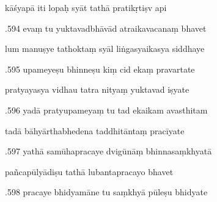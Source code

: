 \documentclass[article,12pt,a4paper]{memoir}%
\newcounter{parCount}
\begin{document}
	  
	  \pstart \leavevmode%
	kāśyapā iti lopaḥ syāt tathā pratikṛtiṣv api 
	{}
	\pend%
      

	  
	  \pstart {}.594 evaṃ tu yuktavadbhāvād atraikavacanaṃ bhavet 
	{}
	\pend%
      

	  
	  \pstart \leavevmode%
	lum manuṣye tathoktaṃ syāl liṅgasyaikasya siddhaye 
	{}
	\pend%
      

	  
	  \pstart {}.595 upameyeṣu bhinneṣu kiṃ cid ekaṃ pravartate 
	{}
	\pend%
      

	  
	  \pstart \leavevmode%
	pratyayasya vidhau tatra nityaṃ yuktavad iṣyate 
	{}
	\pend%
      

	  
	  \pstart {}.596 yadā pratyupameyaṃ tu tad ekaikam avasthitam 
	{}
	\pend%
      

	  
	  \pstart \leavevmode%
	tadā bāhyārthabhedena taddhitāntaṃ pracīyate 
	{}
	\pend%
      

	  
	  \pstart {}.597 yathā samūhapracaye dvigūnāṃ bhinnasaṃkhyatā 
	{}
	\pend%
      

	  
	  \pstart \leavevmode%
	pañcapūlyādiṣu tathā lubantapracayo bhavet 
	{}
	\pend%
      

	  
	  \pstart {}.598 pracaye bhidyamāne tu saṃkhyā pūleṣu bhidyate 
	{}
	\pend%
      
\end{document}
